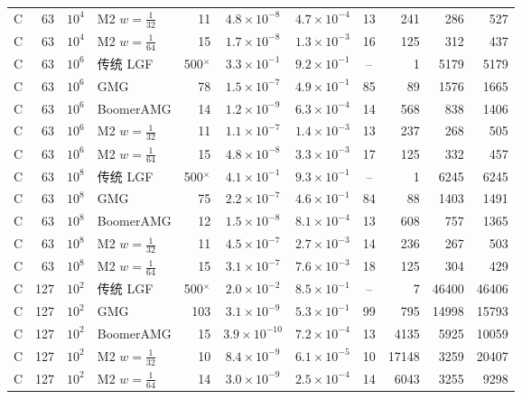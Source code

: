 \begin{longtable}{lrrlrcccrrr}
C & 63 & $10^{4}$ & M2 $w{=}\frac1{32}$ & 11 & $4.8{\times}10^{-8}$ & $4.7{\times}10^{-4}$ & 13 & 241 & 286 & 527 \\
C & 63 & $10^{4}$ & M2 $w{=}\frac1{64}$ & 15 & $1.7{\times}10^{-8}$ & $1.3{\times}10^{-3}$ & 16 & 125 & 312 & 437 \\
C & 63 & $10^{6}$ & 传统 LGF & 500$^\times$ & $3.3{\times}10^{-1}$ & $9.2{\times}10^{-1}$ & -- & 1 & 5179 & 5179 \\
C & 63 & $10^{6}$ & GMG & 78 & $1.5{\times}10^{-7}$ & $4.9{\times}10^{-1}$ & 85 & 89 & 1576 & 1665 \\
C & 63 & $10^{6}$ & BoomerAMG & 14 & $1.2{\times}10^{-9}$ & $6.3{\times}10^{-4}$ & 14 & 568 & 838 & 1406 \\
C & 63 & $10^{6}$ & M2 $w{=}\frac1{32}$ & 11 & $1.1{\times}10^{-7}$ & $1.4{\times}10^{-3}$ & 13 & 237 & 268 & 505 \\
C & 63 & $10^{6}$ & M2 $w{=}\frac1{64}$ & 15 & $4.8{\times}10^{-8}$ & $3.3{\times}10^{-3}$ & 17 & 125 & 332 & 457 \\
C & 63 & $10^{8}$ & 传统 LGF & 500$^\times$ & $4.1{\times}10^{-1}$ & $9.3{\times}10^{-1}$ & -- & 1 & 6245 & 6245 \\
C & 63 & $10^{8}$ & GMG & 75 & $2.2{\times}10^{-7}$ & $4.6{\times}10^{-1}$ & 84 & 88 & 1403 & 1491 \\
C & 63 & $10^{8}$ & BoomerAMG & 12 & $1.5{\times}10^{-8}$ & $8.1{\times}10^{-4}$ & 13 & 608 & 757 & 1365 \\
C & 63 & $10^{8}$ & M2 $w{=}\frac1{32}$ & 11 & $4.5{\times}10^{-7}$ & $2.7{\times}10^{-3}$ & 14 & 236 & 267 & 503 \\
C & 63 & $10^{8}$ & M2 $w{=}\frac1{64}$ & 15 & $3.1{\times}10^{-7}$ & $7.6{\times}10^{-3}$ & 18 & 125 & 304 & 429 \\
C & 127 & $10^{2}$ & 传统 LGF & 500$^\times$ & $2.0{\times}10^{-2}$ & $8.5{\times}10^{-1}$ & -- & 7 & 46400 & 46406 \\
C & 127 & $10^{2}$ & GMG & 103 & $3.1{\times}10^{-9}$ & $5.3{\times}10^{-1}$ & 99 & 795 & 14998 & 15793 \\
C & 127 & $10^{2}$ & BoomerAMG & 15 & $3.9{\times}10^{-10}$ & $7.2{\times}10^{-4}$ & 13 & 4135 & 5925 & 10059 \\
C & 127 & $10^{2}$ & M2 $w{=}\frac1{32}$ & 10 & $8.4{\times}10^{-9}$ & $6.1{\times}10^{-5}$ & 10 & 17148 & 3259 & 20407 \\
C & 127 & $10^{2}$ & M2 $w{=}\frac1{64}$ & 14 & $3.0{\times}10^{-9}$ & $2.5{\times}10^{-4}$ & 14 & 6043 & 3255 & 9298 \\

\end{longtable}
